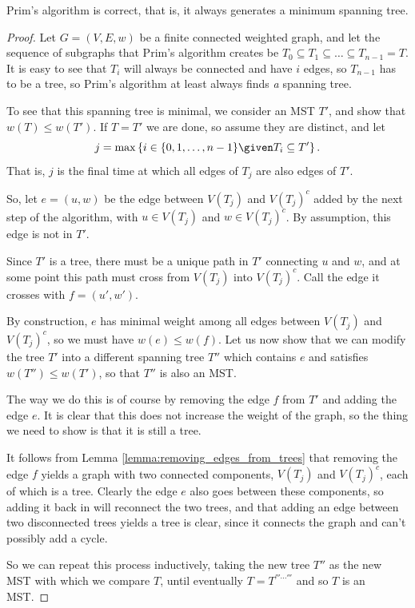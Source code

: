 \documentclass[nobib]{tufte-handout}
\begin{document}
\begin{theorem}
  Prim's algorithm is correct, that is, it always generates a minimum spanning tree.

  \begin{proof}
    Let $G = (V,E,w)$ be a finite connected weighted graph, and let the sequence of subgraphs that Prim's algorithm creates be $T_0 \subseteq T_1 \subseteq \ldots \subseteq T_{n-1} = T$. It is easy to see that $T_i$ will always be connected and have $i$ edges, so $T_{n-1}$ has to be a tree, so Prim's algorithm at least always finds \emph{a} spanning tree.
    
    To see that this spanning tree is minimal, we consider an MST $T'$, and show that $w(T) \leq w(T')$. If $T = T'$ we are done, so assume they are distinct, and let
    $$j = \max\left\{i \in \{0,1,\ldots,n-1\} \given T_i \subseteq T'\right\}.$$
    That is, $j$ is the final time at which all edges of $T_j$ are also edges of $T'$.

    So, let $e = (u, w)$ be the edge between $V(T_j)$ and $V(T_j)^c$ added by the next step of the algorithm, with $u \in V(T_j)$ and $w \in V(T_j)^c$. By assumption, this edge is not in $T'$.
    
    Since $T'$ is a tree, there must be a unique path in $T'$ connecting $u$ and $w$, and at some point this path must cross from $V(T_j)$ into $V(T_j)^c$. Call the edge it crosses with $f = (u', w')$.

    By construction, $e$ has minimal weight among all edges between $V(T_j)$ and $V(T_j)^c$, so we must have $w(e) \leq w(f)$. Let us now show that we can modify the tree $T'$ into a different spanning tree $T''$ which contains $e$ and satisfies $w(T'') \leq w(T')$, so that $T''$ is also an MST.

    The way we do this is of course by removing the edge $f$ from $T'$ and adding the edge $e$. It is clear that this does not increase the weight of the graph, so the thing we need to show is that it is still a tree. 
    
    It follows from Lemma \ref{lemma:removing_edges_from_trees} that removing the edge $f$ yields a graph with two connected components, $V(T_j)$ and $V(T_j)^c$, each of which is a tree. Clearly the edge $e$ also goes between these components, so adding it back in will reconnect the two trees, and that adding an edge between two disconnected trees yields a tree is clear, since it connects the graph and can't possibly add a cycle.

    So we can repeat this process inductively, taking the new tree $T''$ as the new MST with which we compare $T$, until eventually $T = T^{'''\cdots'''}$ and so $T$ is an MST.
  \end{proof}
\end{theorem}
\end{document}
